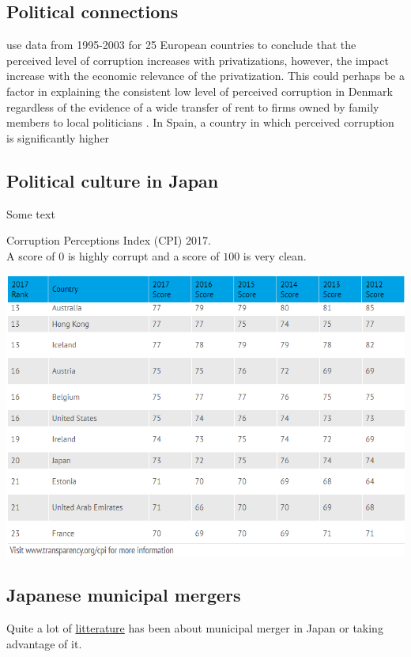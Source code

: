 \subsection{Political connections}
\citet{pena2018privatization} use data from 1995-2003 for 25 European countries to conclude that the perceived level of corruption increases with privatizations, however, the impact increase with the economic relevance of the privatization. This could perhaps be a factor in explaining the consistent low level of perceived corruption in Denmark regardless of the evidence of a wide transfer of rent to firms owned by family members to local politicians \citep{amore2013value}. In Spain, a country in which perceived corruption is significantly higher
\citep{amore2013value,pena2018privatization,albalate2017weakening}


\subsection{Political culture in Japan}
Some text
\begin{table}[H]
  \centering
  \footnotesize
  \caption{Corruption Perceptions Index (CPI) 2017.\\
  A score of $0$ is highly corrupt and a score of $100$ is very clean.}
    \includegraphics[width= \textwidth]{04_tables/CPI}
  \label{tab:CPI}
\end{table}



 
\subsection{Japanese municipal mergers}
Quite a lot of \href{https://scholar.google.es/scholar?q=japanese+municipal+mergers&hl=da&as_sdt=0&as_vis=1&oi=scholart}{litterature} has been about municipal merger in Japan or taking advantage of it.
